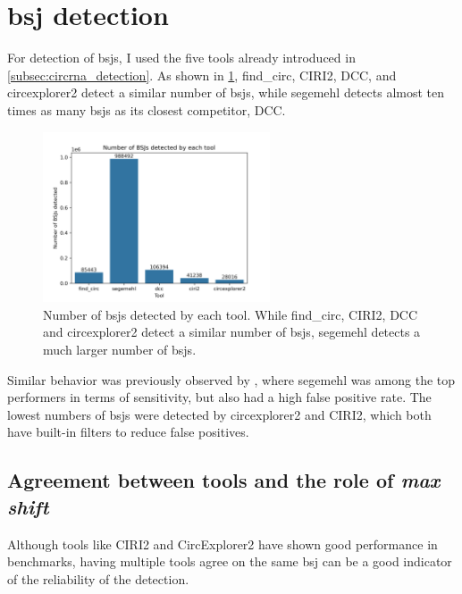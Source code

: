 \section{\Acrfull{bsj} detection}

For detection of \gls{bsj}s, I used the five tools already introduced in
\cref{subsec:circrna_detection}.
As shown in \cref{fig:detection_bars}, find\_circ, CIRI2, DCC, and
circexplorer2 detect a similar number of \gls{bsj}s, while segemehl detects
almost ten times as many \gls{bsj}s as its closest competitor, DCC.

\begin{figure}[ht] \centering

    \includegraphics[width=0.6\textwidth]{chapters/4_results_and_discussion/figures/detection/n_bsjs_detected.png}
    \caption{Number of \gls{bsj}s detected by each tool.
        While find\_circ, CIRI2, DCC and circexplorer2 detect a similar number of
        \gls{bsj}s, segemehl detects a much larger number of \gls{bsj}s.
    }
    \label{fig:detection_bars}
\end{figure}
Similar behavior was previously observed by \textcite{zeng_comprehensive_2017},
where segemehl was among the top performers in terms of sensitivity, but also
had a high false positive rate.
The lowest numbers of \gls{bsj}s were detected by circexplorer2 and CIRI2,
which both have built-in filters to reduce false
positives\supercite{zhang_diverse_2016,gao_circular_2018}.

\subsection{Agreement between tools and the role of \textit{max shift}}

Although tools like CIRI2 and CircExplorer2 have shown good performance in
benchmarks, having multiple tools agree on the same \gls{bsj} can be a good
indicator of the reliability of the detection.

